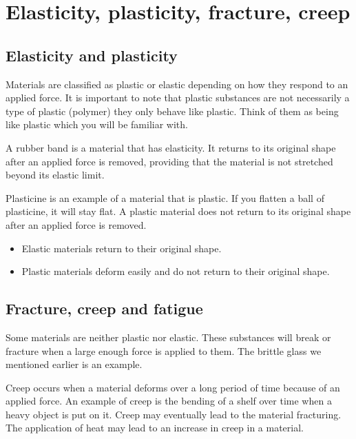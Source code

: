 \section{Elasticity, plasticity, fracture, creep}

\subsection{Elasticity and plasticity}

Materials are classified as plastic or elastic depending on how they respond to an applied force. It is important to note that plastic substances are not necessarily a type of plastic (polymer) they only behave like plastic. Think of them as being like plastic which you will be familiar with.

A rubber band is a material that has elasticity. It returns to its original shape after an applied force is removed, providing that the material is not stretched beyond its elastic limit.

Plasticine is an example of a material that is plastic. If you flatten a ball of plasticine, it will stay flat. A plastic material does not return to its original shape after an applied force is removed.

\begin{itemize}
\item Elastic materials return to their original shape.
\item Plastic materials deform easily and do not return to their original shape.
\end{itemize}

\subsection {Fracture, creep and fatigue}

Some materials are neither plastic nor elastic. These substances will break or fracture when a large enough force is applied to them. The brittle glass we mentioned earlier is an example.
 
Creep occurs when a material deforms over a long period of time because of an applied force. An example of creep is the bending of a shelf over time when a heavy object is put on it. Creep may eventually lead to the material fracturing. The application of heat may lead to an increase in creep in a material.

